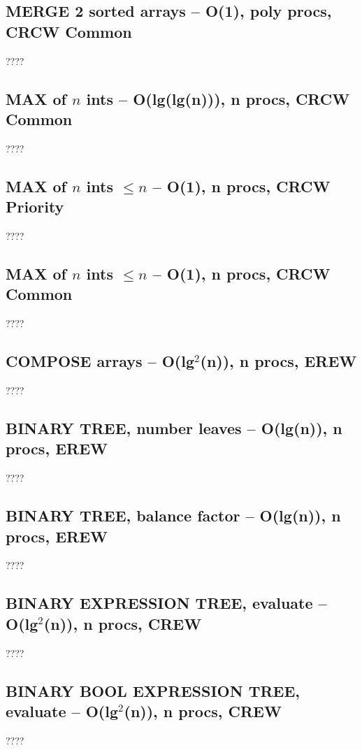\documentclass[12pt]{article}
\begin{document}
\subsection{MERGE 2 sorted arrays -- O(1), poly procs, CRCW Common}
????


\subsection{MAX of $n$ ints -- O(lg(lg(n))), n procs, CRCW Common}
????

\subsection{MAX of $n$ ints $\leq n$ -- O(1), n procs, CRCW Priority}
????

\subsection{MAX of $n$ ints $\leq n$ -- O(1), n procs, CRCW Common}
????


\subsection{COMPOSE arrays -- O(lg$^2$(n)), n procs, EREW}
????

\subsection{BINARY TREE, number leaves -- O(lg(n)), n procs, EREW}
????


\subsection{BINARY TREE, balance factor -- O(lg(n)), n procs, EREW}
????


\subsection{BINARY EXPRESSION TREE, evaluate -- O(lg$^2$(n)), n procs, CREW}
????

\subsection{BINARY BOOL EXPRESSION TREE, evaluate -- O(lg$^2$(n)), n procs, CREW}
????
\end{document}
